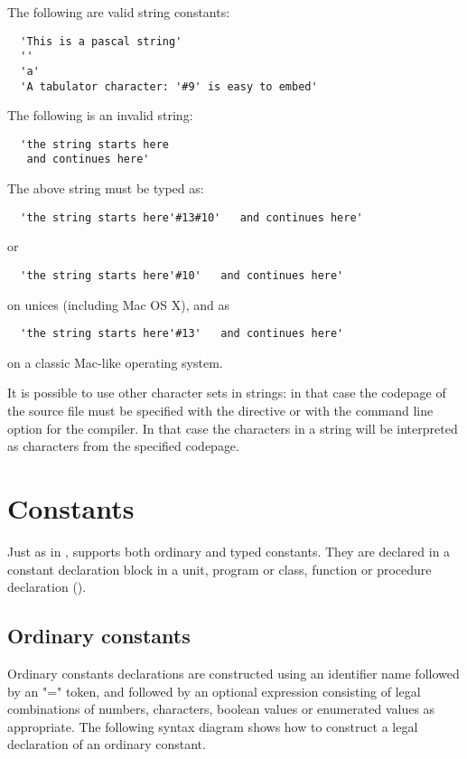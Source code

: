 The following are valid string constants:
\begin{verbatim}
  'This is a pascal string'
  ''
  'a'
  'A tabulator character: '#9' is easy to embed'
\end{verbatim}
The following is an invalid string:
\begin{verbatim}
  'the string starts here
   and continues here'
\end{verbatim}
The above string must be typed as:
\begin{verbatim}
  'the string starts here'#13#10'   and continues here'
\end{verbatim}
or
\begin{verbatim}
  'the string starts here'#10'   and continues here'
\end{verbatim}
on unices (including Mac OS X), and as
\begin{verbatim}
  'the string starts here'#13'   and continues here'
\end{verbatim}
on a classic Mac-like operating system.
 
It is possible to use other character sets in strings: in that case the 
codepage of the source file must be specified with the 
directive or with the  command line option for the compiler. In that
case the characters in a string will be interpreted as characters from the
specified codepage.

\chapter{Constants}
 
Just as in \tp, \fpc supports both ordinary and typed constants. They are
declared in a constant declaration block in a unit, program or class, function or
procedure declaration ().

\section{Ordinary constants}
 
Ordinary constants declarations are constructed using an identifier name 
followed by an "=" token, and followed by an optional expression consisting 
of legal combinations of numbers, characters, boolean values or enumerated 
values as appropriate. The following syntax diagram shows how to construct 
a legal declaration of an ordinary constant.


